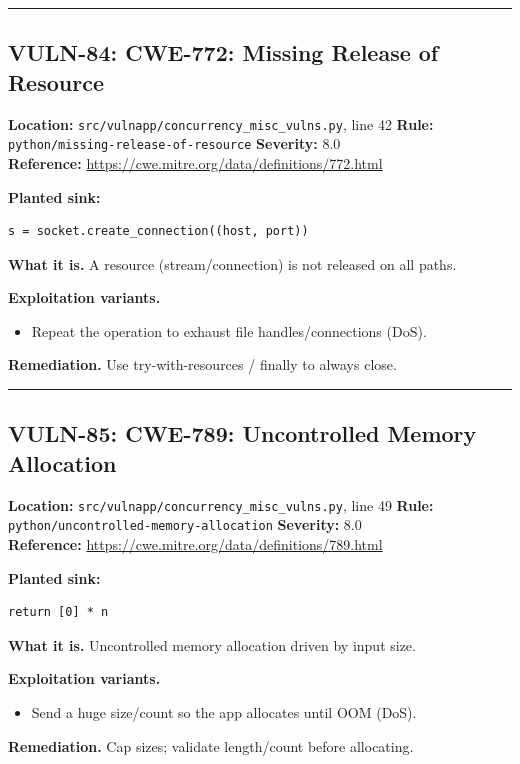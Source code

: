 \documentclass[11pt,a4paper]{article}
\begin{document}
\vspace{4pt}\hrule\vspace{6pt}
\subsection{VULN-84: CWE-772: Missing Release of Resource}
\noindent\textbf{Location:} \texttt{src/vulnapp/concurrency\_misc\_vulns.py}, line 42 \quad \textbf{Rule:} \texttt{python/missing-release-of-resource} \quad \textbf{Severity:} 8.0
\\ \textbf{Reference:} \url{https://cwe.mitre.org/data/definitions/772.html}

\noindent\textbf{Planted sink:}
\begin{lstlisting}
s = socket.create_connection((host, port))
\end{lstlisting}
\noindent\textbf{What it is.} A resource (stream/connection) is not released on all paths.

\noindent\textbf{Exploitation variants.}
\begin{itemize}[leftmargin=1.4em,itemsep=1pt,topsep=2pt]
\item Repeat the operation to exhaust file handles/connections (DoS).
\end{itemize}
\noindent\textbf{Remediation.} Use try-with-resources / finally to always close.

\vspace{4pt}\hrule\vspace{6pt}
\subsection{VULN-85: CWE-789: Uncontrolled Memory Allocation}
\noindent\textbf{Location:} \texttt{src/vulnapp/concurrency\_misc\_vulns.py}, line 49 \quad \textbf{Rule:} \texttt{python/uncontrolled-memory-allocation} \quad \textbf{Severity:} 8.0
\\ \textbf{Reference:} \url{https://cwe.mitre.org/data/definitions/789.html}

\noindent\textbf{Planted sink:}
\begin{lstlisting}
return [0] * n
\end{lstlisting}
\noindent\textbf{What it is.} Uncontrolled memory allocation driven by input size.

\noindent\textbf{Exploitation variants.}
\begin{itemize}[leftmargin=1.4em,itemsep=1pt,topsep=2pt]
\item Send a huge size/count so the app allocates until OOM (DoS).
\end{itemize}
\noindent\textbf{Remediation.} Cap sizes; validate length/count before allocating.
\end{document}
